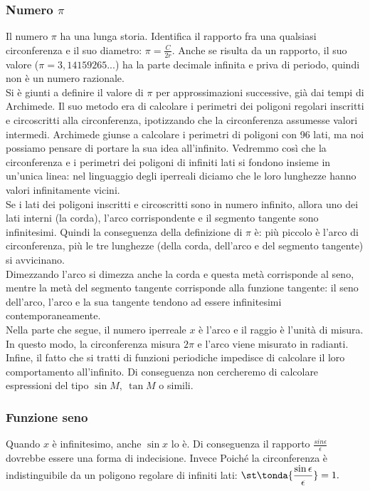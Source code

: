 \subsubsection{Numero \(\pi\)}
\label{subsubsec:insnum_pigreco}
Il numero \(\pi\) ha una lunga storia. Identifica 
il rapporto fra una qualsiasi circonferenza e il suo diametro: 
\(\pi=\frac{C}{2r}\). 
Anche se risulta da un rapporto, il suo valore (\(\pi=3,14159265...\)) 
ha la parte decimale infinita e priva di periodo, quindi non è un numero 
razionale.\\
Si è giunti a definire il valore di \(\pi\) per approssimazioni
successive, già dai tempi di Archimede. Il suo metodo era di
calcolare i perimetri dei poligoni regolari inscritti e
circoscritti alla circonferenza, ipotizzando che la circonferenza
assumesse valori intermedi. Archimede giunse a calcolare i perimetri
di poligoni con 96 lati, ma noi possiamo pensare di portare la sua idea
all'infinito. Vedremmo così che la circonferenza e i perimetri dei poligoni 
di infiniti lati si fondono insieme in un'unica linea: nel linguaggio degli
iperreali diciamo che le loro lunghezze hanno valori infinitamente vicini.\\
Se i lati dei poligoni inscritti e circoscritti sono in numero infinito,
allora uno dei lati interni (la corda), l'arco corrispondente e il segmento 
tangente sono infinitesimi. 
Quindi la conseguenza della definizione di \(\pi\) è:
più piccolo è l'arco di circonferenza, più le tre lunghezze (della corda, 
dell'arco e del segmento tangente) si avvicinano.\\
Dimezzando l'arco si dimezza anche la corda e questa metà corrisponde al seno,
mentre la metà del segmento tangente corrisponde alla funzione tangente:
il seno dell'arco, l'arco e la sua tangente tendono  ad essere 
infinitesimi contemporaneamente.\\
Nella parte che segue, il numero iperreale \(x\) è l'arco e il raggio è l'unità 
di misura. In questo modo, la circonferenza misura \(2\pi\) e l'arco 
viene misurato in radianti.\\
Infine, il fatto che si tratti di funzioni periodiche impedisce di calcolare
il loro comportamento all'infinito. Di conseguenza non cercheremo di 
calcolare 
espressioni del tipo \(\sin M,\ \tan M\) o simili.

\subsubsection{Funzione seno}
\label{subsubsec:insnum_fseno}
Quando \(x\) è infinitesimo, anche \(\sin x\) lo è. Di conseguenza il rapporto
\(\frac{sin\epsilon}{\epsilon}\) dovrebbe essere una forma di indecisione. 
Invece Poiché la circonferenza è indistinguibile da un poligono regolare di 
infiniti lati: \qquad
\(\displaystyle
 \st\tonda{\frac{\sin \epsilon}{\epsilon}}=1.
\)

